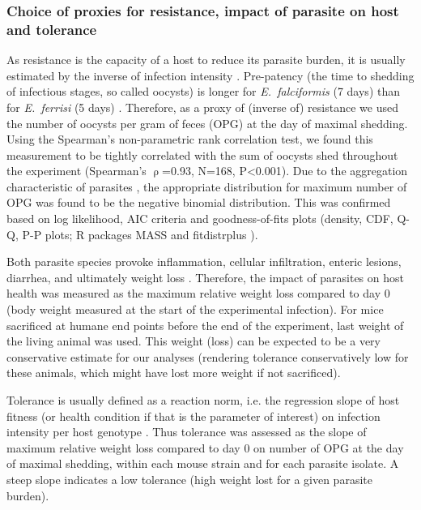 \documentclass[12pt]{article}
\begin{document}
\subsubsection{Choice of proxies for resistance, impact of parasite on host and tolerance}
As resistance is the capacity of a host to reduce its parasite burden, it is usually estimated by the inverse of infection intensity \citep{raaberg_decomposing_2009}. Pre-patency (the time to shedding of infectious stages, so called oocysts) is longer for \textit{E.~falciformis} (7 days) than for \textit{E.~ferrisi} (5 days) \citep{al-khlifeh_eimeria_2019}. Therefore, as a proxy of (inverse of) resistance we used the number of oocysts per gram of feces (OPG) at the day of maximal shedding. Using the Spearman's non-parametric rank correlation test, we found this measurement to be tightly correlated with the sum of oocysts shed throughout the experiment (Spearman's $\uprho$=0.93, N=168, P<0.001). Due to the aggregation characteristic of parasites \citep{shaw_patterns_1995}, the appropriate distribution for maximum number of OPG was found to be the negative binomial distribution. This was confirmed based on log likelihood, AIC criteria and goodness-of-fits plots (density, CDF, Q-Q, P-P plots; R packages MASS \citep{venables_modern_2002} and fitdistrplus \citep{delignette-muller_fitdistrplus_2015}). \par

Both parasite species provoke inflammation, cellular infiltration, enteric lesions, diarrhea, and ultimately weight loss \citep{ankrom_life_1975, ehret_dual_2017, schito_comparison_1996, al-khlifeh_eimeria_2019}. Therefore, the impact of parasites on host health was measured as the maximum relative weight loss compared to day 0 (body weight measured at the start of the experimental infection). For mice sacrificed at humane end points before the end of the experiment, last weight of the living animal was used. This weight (loss) can be expected to be a very conservative estimate for our analyses (rendering tolerance conservatively low for these animals, which might have lost more weight if not sacrificed). \par

Tolerance is usually defined as a reaction norm, i.e. the regression slope of host fitness (or health condition if that is the parameter of interest) on infection intensity per host genotype \citep{Simms2000, raaberg_decomposing_2009}. Thus tolerance was assessed as the slope of maximum relative weight loss compared to day 0 on number of OPG at the day of maximal shedding, within each mouse strain and for each parasite isolate. A steep slope indicates a low tolerance (high weight lost for a given parasite burden).
\end{document}
